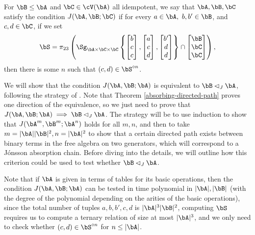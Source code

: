 \begin{defn} For $\bB \le \bA$ and $\bC \in \cV(\bA)$ all idempotent, we say that $\bA,\bB,\bC$ satisfy the condition $J(\bA,\bB;\bC)$ if for every $a \in \bA,\ b, b' \in \bB$, and $c,d \in \bC$, if we set
\[
\bS = \pi_{23}\left(\Sg_{\bA\times\bC\times\bC}\left\{\begin{bmatrix}b\\ c\\ c\end{bmatrix},\begin{bmatrix}a\\ c\\ d\end{bmatrix}, \begin{bmatrix}b'\\ d\\ d\end{bmatrix}\right\} \cap \begin{bmatrix} \bB\\ \bC\\ \bC \end{bmatrix}\right),
\]
then there is some $n$ such that $(c,d) \in \bS^{\circ n}$.
\end{defn}

We will show that the condition $J(\bA,\bB;\bA)$ is equivalent to $\bB \lhd_J \bA$, following the strategy of \cite{deciding-absorption}. Note that Theorem \ref{absorbing-directed-path} proves one direction of the equivalence, so we just need to prove that $J(\bA,\bB;\bA) \implies \bB \lhd_J \bA$. The strategy will be to use induction to show that $J(\bA^m,\bB^m;\bA^n)$ holds for all $m,n$, and then to take $m = |\bA||\bB|^2, n = |\bA|^2$ to show that a certain directed path exists between binary terms in the free algebra on two generators, which will correspond to a J\'onsson absorption chain. Before diving into the details, we will outline how this criterion could be used to test whether $\bB \lhd_J \bA$.

Note that if $\bA$ is given in terms of tables for its basic operations, then the condition $J(\bA,\bB;\bA)$ can be tested in time polynomial in $|\bA|, |\bB|$ (with the degree of the polynomial depending on the arities of the basic operations), since the total number of tuples $a,b,b',c,d$ is $|\bA|^3|\bB|^2$, computing $\bS$ requires us to compute a ternary relation of size at most $|\bA|^3$, and we only need to check whether $(c,d) \in \bS^{\circ n}$ for $n \le |\bA|$.

